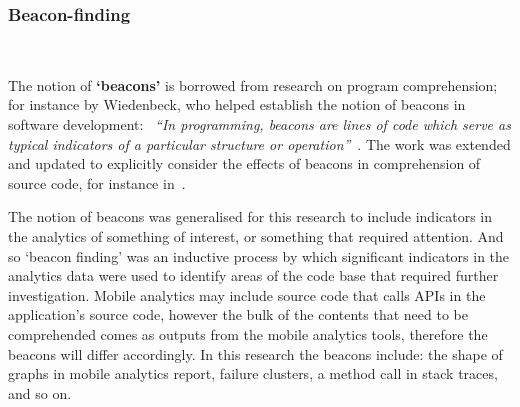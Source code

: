 

\subsubsection{Beacon-finding}~\label{section-beacon-finding-method} %

The notion of \textbf{`beacons'} is borrowed from research on program comprehension; for instance by Wiedenbeck, who helped establish the notion of beacons in software development: ~\emph{``In programming, beacons are lines of code which serve as typical indicators of a particular structure or operation''}~\citep[p. 679]{WIEDENBECK1986_beacons_in_computer_program_comprehension}. The work was extended and updated to explicitly consider the effects of beacons in comprehension of source code, for instance in~\citealt{crosby2002_roles_beacons_play_in_comprehension_etc}.

The notion of beacons was generalised for this research to include indicators in the analytics of something of interest, or something that required attention.  And so `beacon finding' was an inductive process by which significant indicators in the analytics data were used to identify areas of the code base that required further investigation.  Mobile analytics may include source code that calls APIs in the application's source code, however the bulk of the contents that need to be comprehended comes as outputs from the mobile analytics tools, therefore the beacons will differ accordingly. In this research the beacons include: the shape of graphs in mobile analytics report, failure clusters, a method call in stack traces, and so on.



